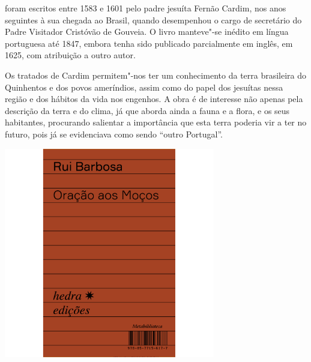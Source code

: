 \hspace*{-7cm}\hrulefill\hspace*{-7cm}

\medskip

 foram escritos entre 1583 e 1601 pelo padre jesuíta Fernão Cardim, nos anos seguintes à sua chegada ao Brasil, quando desempenhou o cargo de secretário do Padre Visitador Cristóvão de Gouveia. O livro manteve"-se inédito em língua portuguesa até 1847, embora tenha sido publicado parcialmente em inglês, em 1625, com atribuição a outro autor.

Os tratados de Cardim permitem"-nos ter um conhecimento da terra brasileira do Quinhentos e dos povos ameríndios, assim como do papel dos jesuítas nessa região e dos hábitos da vida nos engenhos. A obra é de interesse não apenas pela descrição da terra e do clima, já que aborda ainda a fauna e a flora, e os seus habitantes, procurando salientar a importância que esta terra poderia vir a ter no futuro, pois já se evidenciava como sendo “outro Portugal”. 

\vfill

\hspace*{-.4cm}\begin{minipage}[c]{.5\linewidth}
\small{
{}}
\end{minipage}

\pagebreak

\hspace{.5cm}

\begin{center}
\hspace*{.5cm}\includegraphics[width=92mm]{./grid/barbosa.jpg}
\end{center}


